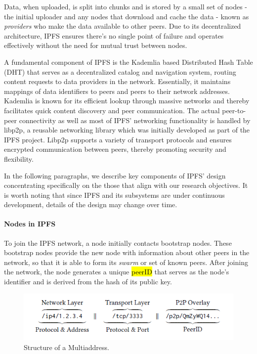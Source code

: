 Data, when uploaded, is split into chunks and is stored by a small set of nodes - the initial uploader and any nodes that download and cache the data - known as \textit{providers} who make the data available to other peers. Due to its decentralized architecture, IPFS ensures there's no single point of failure and operates effectively without the need for mutual trust between nodes.

A fundamental component of IPFS is the Kademlia based Distributed Hash Table (DHT) \citep{maymounkov_2002} that serves as a decentralized catalog and navigation system, routing content requests to data providers in the network. Essentially, it maintains mappings of data identifiers to peers and peers to their network addresses. Kademlia is known \citep{benet_2014} for its efficient lookup through massive networks and thereby facilitates quick content discovery and peer communication. The actual peer-to-peer connectivity as well as most of IPFS' networking functionality is handled by libp2p, a reusable networking library which was initially developed as part of the IPFS project. Libp2p \citep{libp2p_2023} supports a variety of transport protocols and ensures encrypted communication between peers, thereby promoting security and flexibility.

In the following paragraphs, we describe key components of IPFS’ design concentrating specifically on the those that align with our research objectives. It is worth noting that since IPFS and its subsystems are under continuous development, details of the design may change over time.

\paragraph{Nodes in IPFS}\label{par:nodes_ipfs}
To join the IPFS network, a node initially contacts bootstrap nodes. These bootstrap nodes provide the new node with information about other peers in the network, so that it is able to form its \textit{swarm} or set of known peers. After joining the network, the node generates a unique \hl{peerID} that serves as the node's identifier and is derived from the hash of its public key.

\begin{figure}[htbp]
    \centerline{\includegraphics{figs/Multiaddress.png}}
    \caption{Structure of a Multiaddress. \citep{trautwein_2022}}
    \label{fig:multiaddress}
\end{figure}

